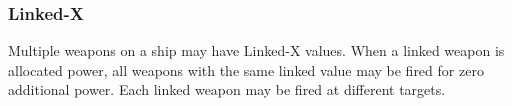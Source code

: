 \subsubsection{Linked-X}
Multiple weapons on a ship may have Linked-X values. When a linked weapon is allocated power, all weapons with the same linked value may be fired for zero additional power. Each linked weapon may be fired at different targets.

